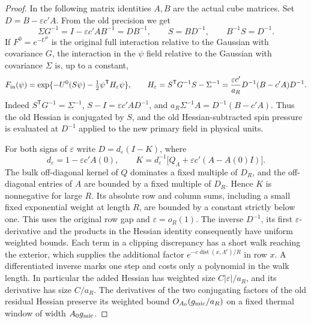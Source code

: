 \documentclass[11pt]{article}
\theoremstyle{definition}
\newcommand{\dist}{\operatorname{dist}}
\begin{document}
\begin{proof}
In the following matrix identities \(A,B\) are the actual cube
matrices. Set \(D=B-\varepsilon c'A\). From the old precision we get
\begin{equation}
 \Sigma G^{-1}=I-\varepsilon c'AB^{-1}=DB^{-1},\qquad
 S=BD^{-1},\qquad B^{-1}S=D^{-1}.
\end{equation}
If \(F^0=e^{-U^0}\) is the original full interaction relative to
the Gaussian with covariance \(G\), the interaction in the
\(\psi\) field relative to the Gaussian with covariance \(\Sigma\)
is, up to a constant,
\begin{equation}
 F_{\rm in}(\psi)=
 \exp\{-U^0(S\psi)-\tfrac12\psi^{\mathsf T}H_\varepsilon\psi\},
 \qquad
 H_\varepsilon=S^{\mathsf T}G^{-1}S-\Sigma^{-1}
 =\frac{\varepsilon c'}{a_R}D^{-1}(B-c'A)D^{-1}.
\end{equation}
Indeed \(S^{\mathsf T}G^{-1}=\Sigma^{-1}\),
\(S-I=\varepsilon c'A D^{-1}\), and
\(a_R\Sigma^{-1}A=D^{-1}(B-c'A)\).
Thus the old Hessian is conjugated by \(S\), and the old
Hessian-subtracted spin pressure is evaluated at \(D^{-1}\)
applied to the new primary field in physical units.

For both signs of \(\varepsilon\) write \(D=d_{\varepsilon}(I-K)\), where
\begin{equation}
 d_{\varepsilon}=1-\varepsilon c'A(0),\qquad
 K=d_{\varepsilon}^{-1}\big[Q_\Lambda+\varepsilon c'(A-A(0)I)\big].
\end{equation}
The bulk off-diagonal kernel of \(Q\) dominates a fixed multiple of
\(D_R\), and the off-diagonal entries of \(A\) are bounded by
a fixed multiple of \(D_R\). Hence \(K\) is nonnegative for
large \(R\). Its absolute row and column sums, including a
small fixed exponential weight at length \(R\), are bounded
by a constant strictly below one. This uses the original row
gap and \(\varepsilon=o_R(1)\).
The inverse \(D^{-1}\), its first \(\varepsilon\)-derivative
and the products in the Hessian identity consequently have
uniform weighted bounds. Each term in a clipping discrepancy
has a short walk reaching the exterior, which supplies the
additional factor \(e^{-c\dist(x,\Lambda^c)/R}\) in row \(x\).
A differentiated inverse marks one step and costs only a
polynomial in the walk length. In particular the added Hessian
has weighted size \(C|\varepsilon|/a_R\), and its derivative
has size \(C/a_R\). The derivatives of the two conjugating
factors of the old residual Hessian preserve its weighted
bound \(O_{A_0}(g_{\rm mic}/a_R)\) on a fixed thermal window
of width \(A_0g_{\rm mic}\).


\end{proof}
\end{document}
